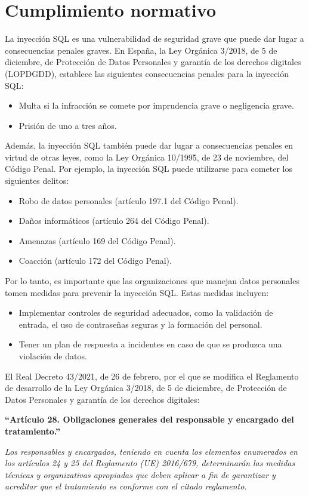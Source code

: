 \documentclass[11pt]{report}
\begin{document}
\section{Cumplimiento normativo}
La inyección SQL es una vulnerabilidad de seguridad grave que puede dar lugar a consecuencias penales graves. En España, la Ley Orgánica 3/2018,
de 5 de diciembre, de Protección de Datos Personales y garantía de los derechos digitales (LOPDGDD), establece las siguientes consecuencias penales
para la inyección SQL:
\begin{itemize}
  \item Multa si la infracción se comete por imprudencia grave o negligencia grave.
  \item Prisión de uno a tres años.
\end{itemize}

Además, la inyección SQL también puede dar lugar a consecuencias penales en virtud de otras leyes, como la Ley Orgánica 10/1995, de 23 de noviembre,
del Código Penal. Por ejemplo, la inyección SQL puede utilizarse para cometer los siguientes delitos:
\begin{itemize}
  \item Robo de datos personales (artículo 197.1 del Código Penal).
  \item Daños informáticos (artículo 264 del Código Penal).
  \item Amenazas (artículo 169 del Código Penal).
  \item Coacción (artículo 172 del Código Penal).
\end{itemize}

Por lo tanto, es importante que las organizaciones que manejan datos personales tomen medidas para prevenir la inyección SQL. Estas medidas incluyen:
\begin{itemize}
  \item Implementar controles de seguridad adecuados, como la validación de entrada, el uso de contraseñas seguras y la formación del personal.
  \item Tener un plan de respuesta a incidentes en caso de que se produzca una violación de datos.
\end{itemize}

El Real Decreto 43/2021, de 26 de febrero, por el que se modifica el Reglamento de desarrollo de la Ley Orgánica 3/2018, de 5 de diciembre, de Protección
de Datos Personales y garantía de los derechos digitales:

\begin{center}
  \textbf{“Artículo 28. Obligaciones generales del responsable y encargado del tratamiento.”}
\end{center}
\emph{Los responsables y encargados, teniendo en cuenta los elementos enumerados en los artículos 24 y 25 del Reglamento (UE) 2016/679, determinarán las
medidas técnicas y organizativas apropiadas que deben aplicar a fin de garantizar y acreditar que el tratamiento es conforme con el citado reglamento.}
\end{document}
